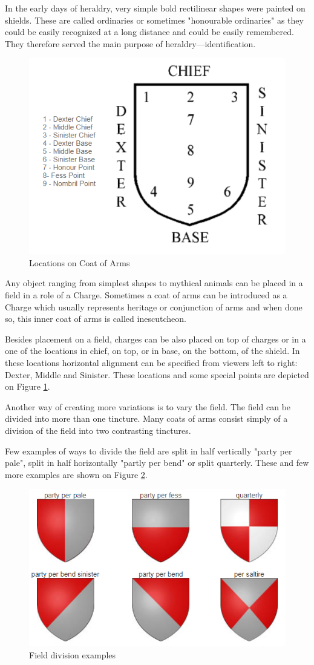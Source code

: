 \documentclass[12pt,a4paper]{article}
\begin{document}
In the early days of heraldry, very simple bold rectilinear shapes were painted on shields. These are called ordinaries or sometimes "honourable ordinaries" as they could be easily recognized at a long distance and could be easily remembered.
They therefore served the main purpose of heraldry—identification. \cite{InternationalHeraldry}

\begin{figure}
	\centering
	\includegraphics[width=0.5\linewidth]{img/locations}
	\caption{Locations on Coat of Arms}
	\label{fig:locations}
\end{figure}
Any object ranging from simplest shapes to mythical animals can be placed in a field in a role of a Charge.
Sometimes a coat of arms can be introduced as a Charge which usually represents heritage or conjunction of arms and when done so, this inner coat of arms is called inescutcheon.
\pagebreak

Besides placement on a field, charges can be also placed on top of charges or in a one of the locations in chief, on top, or in base, on the bottom, of the shield.
In these locations horizontal alignment can be specified from viewers left to right: Dexter, Middle and Sinister.
These locations and some special points are depicted on Figure \ref{fig:locations}.

Another way of creating more variations is to vary the field. The field can be divided into more than one tincture.
Many coats of arms consist simply of a division of the field into two contrasting tinctures. \cite{InternationalHeraldry}

Few examples of ways to divide the field are split in half vertically "party per pale", split in half horizontally "partly per bend" or split quarterly. These and few more examples are shown on Figure \ref{fig:fielddivisions}.
\begin{figure}[h]
	\centering
	\includegraphics[width=0.60\linewidth]{img/fieldDivisions}
	\caption{Field division examples}
	\label{fig:fielddivisions}
\end{figure}
\end{document}

